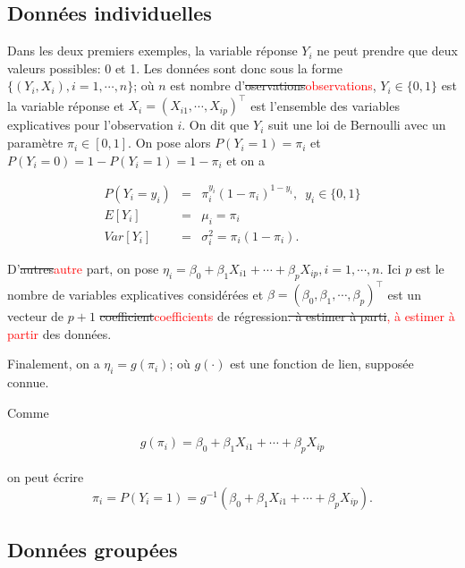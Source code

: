 \documentclass[11pt]{article}
\begin{document}
\subsection{Données individuelles}

\noindent Dans les deux premiers exemples, la variable réponse $Y_i$ ne peut prendre 	que deux valeurs possibles: 0 et 1. Les données sont donc sous la forme $\{(Y_i,X_i), i=1,\cdots,n\}$; où $n$ est nombre d'\sout{oservations}\textcolor{red}{observations}, $Y_i \in \{0,1\}$ est la variable réponse et $X_i=(X_{i1},\cdots,X_{ip})^\top$ est l'ensemble des variables explicatives pour l'observation $i$. On dit que $Y_i$ suit une loi de Bernoulli avec un paramètre $\pi_i \in [0,1]$. On pose alors $P(Y_i=1)=\pi_i$ et $P(Y_i=0)=1-P(Y_i=1)=1-\pi_i$ et on a

\begin{eqnarray*}
P(Y_i=y_i)&=& \pi_i^{y_i}(1-\pi_i)^{1-y_i}, \, \, \, y_i \in \{0,1\}\\
E[Y_i] &=& \mu_i = \pi_i \\
Var[Y_i] &=& \sigma^2_i = \pi_i(1-\pi_i).
\end{eqnarray*}

\noindent D'\sout{autres}\textcolor{red}{autre} part, on pose $\eta_i=\beta_0+\beta_1 X_{i1} + \cdots + \beta_p X_{ip}, i=1,\cdots,n$. Ici $p$ est le nombre de variables explicatives considérées et $\beta=(\beta_0,\beta_1,\cdots,\beta_p)^\top$ est un vecteur de $p+1$ \sout{coefficient}\textcolor{red}{coefficients} de régression\sout{. \`a estimer \`a parti}\textcolor{red}{, à estimer à partir} des données. 

\noindent Finalement, on a $\eta_i = g(\pi_i)$; où $g(\cdot)$ est une fonction de lien, supposée connue. 

Comme

\begin{align*}
    g(\pi_i)=\beta_0+\beta_1 X_{i1} + \cdots + \beta_p X_{ip}
\end{align*}

on peut écrire
$$\pi_i = P(Y_i = 1) = g^{-1}(\beta_0+\beta_1 X_{i1} + \cdots + \beta_p X_{ip}).$$

\subsection{Données groupées}
\end{document}

